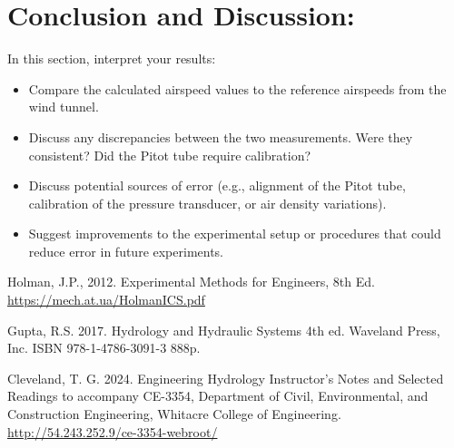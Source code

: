 \documentclass[12pt]{article}
\begin{document}
\section{Conclusion and Discussion:} 
In this section, interpret your results:
\begin{itemize}
\item Compare the calculated airspeed values to the reference airspeeds from the wind tunnel.
\item Discuss any discrepancies between the two measurements. Were they consistent? Did the Pitot tube require calibration?
\item Discuss potential sources of error (e.g., alignment of the Pitot tube, calibration of the pressure transducer, or air density variations).
\item Suggest improvements to the experimental setup or procedures that could reduce error in future experiments.
\end{itemize}

\begin{thebibliography}{}

Holman, J.P., 2012. Experimental Methods for Engineers, 8th Ed. 
\url{https://mech.at.ua/HolmanICS.pdf}

Gupta, R.S. 2017. Hydrology and Hydraulic Systems 4th ed. Waveland Press, Inc. ISBN 978-1-4786-3091-3 888p.

Cleveland, T. G. 2024. Engineering Hydrology Instructor's Notes and Selected Readings to accompany CE-3354, Department of Civil, Environmental, and Construction Engineering, Whitacre College of Engineering. \url{http://54.243.252.9/ce-3354-webroot/}

\end{thebibliography}
\end{document}
